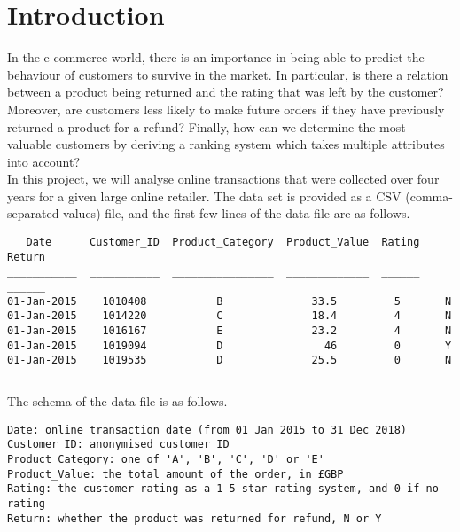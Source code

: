 \section{Introduction}
In the e-commerce world, there is an importance in being able to predict the behaviour of customers to survive in the market. In particular, is there a relation between a product being returned and the rating that was left by the customer? Moreover, are customers less likely to make future orders if they have previously returned a product for a refund? Finally, how can we determine the most valuable customers by deriving a ranking system which takes multiple attributes into account? \\

\noindent
In this project, we will analyse online transactions that were collected over four years for a given large online retailer. The data set is provided as a CSV (comma-separated values) file, and the first few lines of the data file are as follows. \\

\begin{lstlisting}
   Date      Customer_ID  Product_Category  Product_Value  Rating  Return
___________  ___________  ________________  _____________  ______  ______
01-Jan-2015    1010408           B              33.5         5       N 
01-Jan-2015    1014220           C              18.4         4       N 
01-Jan-2015    1016167           E              23.2         4       N 
01-Jan-2015    1019094           D                46         0       Y 
01-Jan-2015    1019535           D              25.5         0       N
\end{lstlisting}
$ $

\noindent
The schema of the data file is as follows.
\begin{lstlisting}[language=none]
Date: online transaction date (from 01 Jan 2015 to 31 Dec 2018)
Customer_ID: anonymised customer ID
Product_Category: one of 'A', 'B', 'C', 'D' or 'E'
Product_Value: the total amount of the order, in £GBP
Rating: the customer rating as a 1-5 star rating system, and 0 if no rating
Return: whether the product was returned for refund, N or Y
\end{lstlisting}
